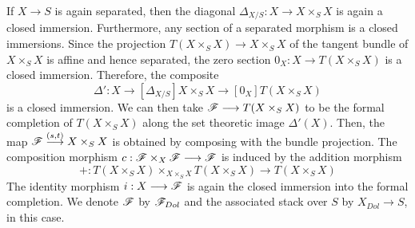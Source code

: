 \documentclass[11pt]{amsart}
\begin{document}
\begin{exm}
\label{exm:Dol-st}
If $X \to S$ is again separated, then the diagonal
$\Delta_{X/S} : X \to X \times_S X$ is again a closed immersion. Furthermore,
any section of a separated morphism is a closed immersions. Since the
projection $T(X \times_S X) \to X \times_S X$ of the tangent bundle of
$X \times_S X$ is affine and hence separated, the zero section
$0_X : X \to T(X \times_S X)$ is a closed immersion. Therefore, the composite
\[
\Delta' : X \to[\Delta_{X/S}] X \times_S X \to[0_X] T(X \times_S X)
\]
is a closed immersion.
We can then take $\sF \to T(X \times_S X)$ to be the
formal completion of $T(X \times_S X)$ along the set theoretic image
$\Delta'(X)$.
Then, the map $\sF \to[{(s, t)}] X \times_S X$ is obtained by
composing with the bundle projection.
The composition morphism $c : \sF \times_X \sF \to \sF$ is induced by
the addition morphism 
\[
+ : T(X \times_S X) \times_{X \times_S X} T(X \times_S X) \to T(X \times_S X)
\]
The identity morphism $i : X \to \sF$
is again the closed immersion into the formal completion.
We denote $\mathscr{F}$ by $\mathscr{F}_{Dol}$ and the associated stack over $S$ by
$X_{Dol} \to S$, in this case.
\end{exm}
\end{document}
